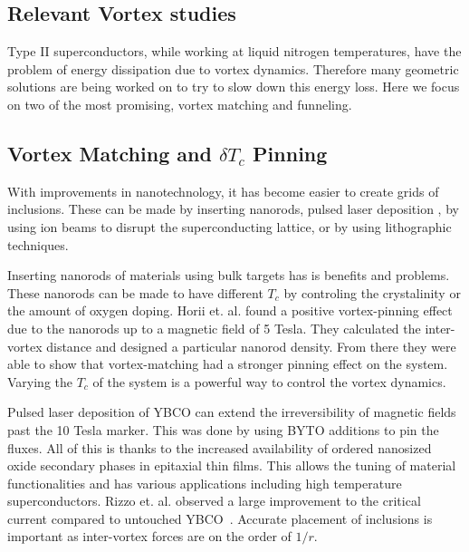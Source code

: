 \subsection{Relevant Vortex studies}

Type II superconductors, while working at liquid nitrogen temperatures, have the problem of energy dissipation due to vortex dynamics. Therefore many geometric solutions are being worked on to try to slow down this energy loss. Here we focus on two of the most promising, vortex matching and funneling.

\subsection{Vortex Matching and $\delta T_c$ Pinning}
With improvements in nanotechnology, it has become easier to create grids of inclusions. These can be made by inserting nanorods, pulsed laser deposition , by using ion beams to disrupt the superconducting lattice, or by using lithographic techniques.

Inserting nanorods of materials using bulk targets has is benefits and problems. These nanorods can be made to have different $T_c$ by controling the crystalinity or the amount of oxygen doping. Horii et. al. \cite{Horii15} found a positive vortex-pinning effect due to the nanorods up to a magnetic field of 5 Tesla. They calculated the inter-vortex distance and designed a particular nanorod density. From there they were able to show that vortex-matching had a stronger pinning effect on the system. Varying the $T_c$ of the system is a powerful way to control the vortex dynamics.

Pulsed laser deposition of YBCO can extend the irreversibility of magnetic fields past the 10 Tesla marker. This was done by using BYTO additions to pin the fluxes. All of this is thanks to the increased availability of ordered nanosized oxide secondary phases in epitaxial thin films. This allows the tuning of material functionalities and has various applications including high temperature superconductors. Rizzo et. al. observed a large improvement to the critical current compared to untouched YBCO~\cite{Rizzo16}. Accurate placement of inclusions is important as inter-vortex forces are on the order of $1/r$.      

